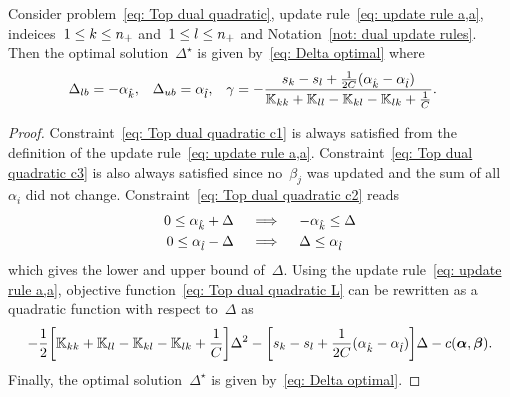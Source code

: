 \begin{lemma}\label{thm: toppushk family quadratic update a,a}
  Consider problem~\eqref{eq: Top dual quadratic}, update rule~\eqref{eq: update rule a,a}, indeices~$1 \leq k \leq n_{+}$ and~$1 \leq l \leq n_{+}$ and Notation~\ref{not: dual update rules}. Then the optimal solution~$\Delta^{\star}$ is given by~\eqref{eq: Delta optimal} where
  \begin{align*}
    \Delta_{lb} & = -\alpha_{\hat{k}}, &
    \Delta_{ub} & = \alpha_{\hat{l}}, &
    \gamma & = -\frac{s_k - s_l + \frac{1}{2C}(\alpha_{\hat{k}} - \alpha_{\hat{l}})}{\mathbb{K}_{kk} + \mathbb{K}_{ll} - \mathbb{K}_{kl} - \mathbb{K}_{lk} + \frac{1}{C}}.
  \end{align*}
\end{lemma}

\begin{proof}
  Constraint~\eqref{eq: Top dual quadratic c1} is always satisfied from the definition of the update rule~\eqref{eq: update rule a,a}. Constraint~\eqref{eq: Top dual quadratic c3} is also always satisfied since no~$\beta_j$ was updated and the sum of all~$\alpha_i$ did not change. Constraint~\eqref{eq: Top dual quadratic c2} reads
  \begin{align*}
    0 \leq \alpha_{\hat{k}} + \Delta
    & \quad \implies \quad
    - \alpha_{\hat{k}} \leq \Delta \\
    0 \leq \alpha_{\hat{l}} - \Delta
    & \quad \implies \quad
    \Delta \leq \alpha_{\hat{l}}
  \end{align*}
  which gives the lower and upper bound of~$\Delta.$ Using the update rule~\eqref{eq: update rule a,a}, objective function~\eqref{eq: Top dual quadratic L} can be rewritten as a quadratic function with respect to~$\Delta$ as
  \begin{equation*}
    - \frac{1}{2} \Brac[s]{\K_{kk} + \K_{ll} - \K_{kl} - \K_{lk} + \frac{1}{C}} \Delta^2
    - \Brac[s]{s_k - s_l + \frac{1}{2C}(\alphak - \alphal)} \Delta
    - c(\bm{\alpha}, \bm{\beta}).
  \end{equation*}
  Finally, the optimal solution~$\Delta^{\star}$ is given by~\eqref{eq: Delta optimal}.
\end{proof}



